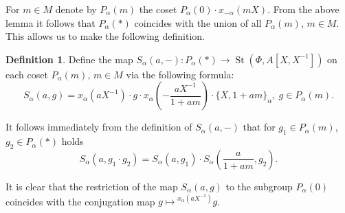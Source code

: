 \documentclass[oneside, 8pt]{amsart}
\theoremstyle{remark}
\theoremstyle{definition}
\newtheorem{df}[lemma]{Definition} \Crefname{df}{Definition}{Definitions}
\DeclareMathOperator{\St}{St}
\numberwithin{equation}{section}
\begin{document}
For $m \in M$ denote by $P_\alpha(m)$ the coset $P_\alpha(0) \cdot x_{-\alpha}(mX)$.
From the above lemma it follows that $P_\alpha(*)$ coincides with the union of all $P_\alpha(m)$, $m\in M$. This allows us to make the following definition. 

\begin{df} Define the map $S_\alpha(a, -) \colon P_\alpha(*) \to \St(\Phi, A[X, X^{-1}])$ on each coset $P_\alpha(m)$, $m \in M$ via the following formula:
\[ S_\alpha(a, g) = x_\alpha(aX^{-1})\cdot g \cdot x_\alpha\left(-\frac{aX^{-1}}{1 + am}\right) \cdot \{X, 1+ am\}_\alpha,\ g \in P_\alpha(m).\] \end{df}
It follows immediately from the definition of $S_\alpha(a, -)$ that for $g_1 \in P_\alpha(m)$, $g_2 \in P_\alpha(*)$ holds
\[ S_\alpha(a, g_1\cdot g_2) = S_\alpha(a, g_1) \cdot S_\alpha\left(\frac{a}{1+am}, g_2\right).\]

It is clear that the restriction of the map $S_\alpha(a, g)$ to the subgroup $P_\alpha(0)$ coincides with the conjugation map $g \mapsto {}^{x_\alpha(aX^{-1})}\!g$.
\end{document}
